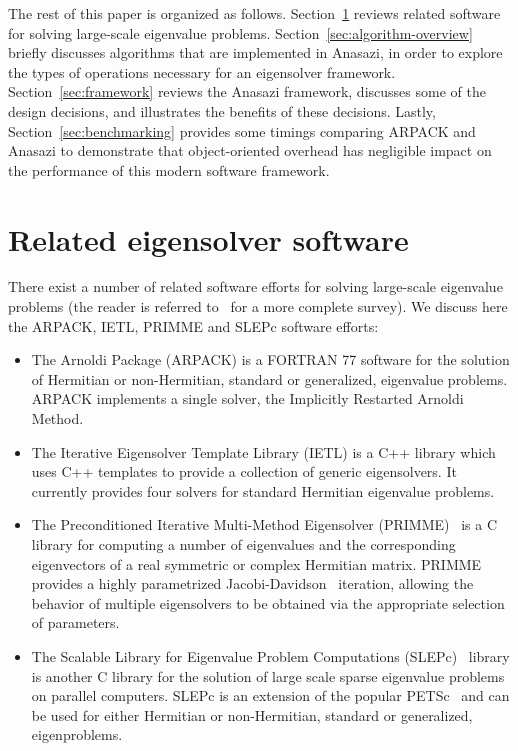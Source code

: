 \documentclass[acmtoms,acmnow]{acmtrans2m}
\begin{document}
The rest of this paper is organized as follows.  Section~\ref{sec:related-software}
reviews related software for solving large-scale eigenvalue problems.
Section~\ref{sec:algorithm-overview} briefly discusses algorithms that are
implemented in Anasazi, in order to explore the types of operations necessary for an
eigensolver framework.  Section~\ref{sec:framework} reviews the Anasazi framework,
discusses some of the design decisions, and illustrates the benefits of these decisions.
Lastly, Section~\ref{sec:benchmarking} provides some timings comparing ARPACK and Anasazi
to demonstrate that object-oriented overhead has negligible impact on the performance of
this modern software framework.


\section{Related eigensolver software}
\label{sec:related-software}

There exist a number of related software efforts for solving large-scale eigenvalue problems (the
reader is referred to~\cite{slepc:05} for a more complete survey). We discuss here the
ARPACK, IETL, PRIMME and SLEPc software efforts:
\begin{itemize}
  \item 
    The Arnoldi Package (ARPACK) is a FORTRAN 77 software for the solution of Hermitian or
    non-Hermitian, standard or generalized, eigenvalue problems. ARPACK implements a single
    solver, the Implicitly Restarted Arnoldi Method.
  \item 
    The Iterative Eigensolver Template Library (IETL) is a C++ library which uses C++
    templates to provide a collection of generic eigensolvers. It currently provides four
    solvers for standard Hermitian eigenvalue problems.
  \item
    The Preconditioned Iterative Multi-Method Eigensolver (PRIMME)~\cite{primme:06} is a C
    library for computing a number of eigenvalues and the corresponding eigenvectors of a real
    symmetric or complex Hermitian matrix. PRIMME provides a highly parametrized
    Jacobi-Davidson~\cite{slvo:96} iteration, allowing the behavior of multiple eigensolvers
    to be obtained via the appropriate selection of parameters.
  \item
    The Scalable Library for Eigenvalue Problem Computations (SLEPc)~\cite{slepc:06} library
    is another C library for the solution of large scale sparse eigenvalue problems on parallel
    computers. SLEPc is an extension of the popular PETSc~\cite{petsc-web-page} and can be
    used for either Hermitian or non-Hermitian, standard or generalized, eigenproblems.
\end{itemize}
\end{document}
